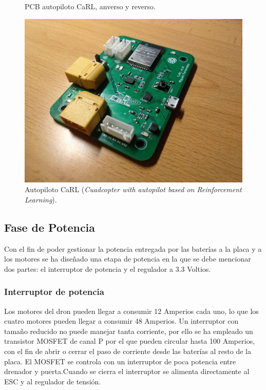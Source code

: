 \begin{figure}[htb!]
\begin{subfigure}{0.49\textwidth}
	\end{subfigure}
	
	\caption{PCB autopiloto CaRL, anverso y reverso.}
	\label{PCB}
	
	
\end{figure}


\begin{figure}[htb!]
	\centering
	\includegraphics[height=0.8\textwidth]{hardware/carl_board}
	\caption{Autopiloto CaRL (\textit{Cuadcopter with autopilot based on Reinforcement Learning}).}
	\label{hardware:carl_board}	
\end{figure}


\subsection{Fase de Potencia}

Con el fin de poder gestionar la potencia entregada por las baterías a la placa y a los motores se ha diseñado una etapa de potencia en la que se debe mencionar dos partes: el interruptor de potencia y el regulador a 3.3 Voltios.

\subsubsection{Interruptor de potencia}

Los motores del dron pueden llegar a consumir 12 Amperios cada uno, lo que los cuatro motores pueden llegar a consumir 48 Amperios. Un interruptor con tamaño reducido no puede manejar tanta corriente, por ello se ha empleado un transistor MOSFET de canal P por el que pueden circular hasta 100 Amperios, con el fin de abrir o cerrar el paso de corriente desde las baterías al resto de la placa. El MOSFET se controla con un interruptor de poca potencia entre drenador y puerta.Cuando se cierra el interruptor se alimenta directamente al ESC y al regulador de tensión.

